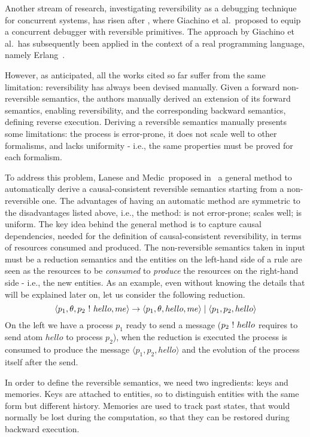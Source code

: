 \documentclass{article}[12pt,a4paper]
\theoremstyle{definition}
\newcommand{\paral}{\;|\;}
\begin{document}
Another stream of research, investigating reversibility as a debugging technique for concurrent systems,
has risen after \cite{GiachinoLM14}, where Giachino et al.~proposed to
equip a concurrent debugger with reversible primitives.
The approach by Giachino et al.~has subsequently been applied in the context of a real programming language, namely Erlang~\cite{LaneseNPV18,Lanese0PV18,Gonzalez-AbrilV21,FabbrettiLS21}.

However, as anticipated, all the works cited so far suffer from the same limitation: reversibility has always been
devised manually. Given a forward non-reversible semantics, the authors manually
derived an extension of its forward semantics, enabling reversibility, and the corresponding backward semantics, defining reverse execution.
Deriving a reversible semantics manually presents some limitations: the
process is error-prone, it does not scale well to other formalisms, and lacks
uniformity - i.e., the same properties must be proved for each formalism.

To address this problem, Lanese and Medic~proposed in~\cite{LaneseM20} a
general method to
automatically derive a causal-consistent reversible semantics starting from a non-reversible one. The
advantages of having an automatic method are symmetric to the disadvantages
listed above, i.e., the method: is not error-prone; scales well; is uniform. The key idea behind the general method is to capture
causal dependencies, needed for the definition of causal-consistent reversibility, in terms of resources consumed and produced. The non-reversible
semantics taken in input must be a reduction semantics and the entities on the
left-hand side of a rule are seen as the resources to be \emph{consumed} to
\emph{produce} the resources on the right-hand side - i.e., the new entities.
As an example, even without knowing the details that will be explained later on, let
us consider the following reduction. 
\begin{equation}\label{samplerule}
\langle p_1, \theta, p_2~\ms{!}~hello, me\rangle \rightarrow \langle p_1, \theta,
hello, me\rangle \paral\langle p_1, p_2,hello \rangle
\end{equation}
On the left we have a process $p_1$ ready to send a
message ($p_2~\mathsf{!}~hello$ requires to send atom $hello$ to process $p_2$), when the reduction is executed the process is consumed to produce the message
$\langle p_1, p_2,hello \rangle$ and the evolution of the process itself after the send.

In order to define the reversible semantics, we need two ingredients: keys and memories.
Keys are attached to entities, so to distinguish entities with the same form but different history.
Memories are used to track past states, that would normally be lost during the computation, so that
they can be restored during backward execution.
\end{document}
